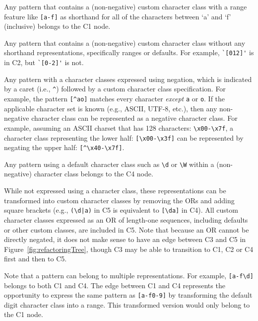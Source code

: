 \begin{description}  \itemsep -1pt
\item[C1:] Any pattern that contains a (non-negative) custom character class with  a range feature like \verb![a-f]! as shorthand for all of the characters between `a' and `f' (inclusive) belongs to the C1 node.

\item[C2:] Any pattern that contains a (non-negative) custom character class  without any shorthand representations, specifically ranges or defaults. For example, \verb!`[012]'! is in C2, but \verb!`[0-2]'! is not.

\item[C3:] Any pattern with a character classes expressed using negation, which is indicated by a caret (i.e., \verb!^!) followed by a custom character class specification.
For example, the pattern \verb![^ao]! matches every character \emph{except} \verb!a! or \verb!o!.  If the applicable character set is known (e.g., ASCII, UTF-8, etc.), then any non-negative character class can be represented as a negative character class.  For example, assuming an ASCII charset that has 128 characters: \verb!\x00-\x7f!, a character class representing the lower half: \verb![\x00-\x3f]! can be represented by negating the upper half: \verb![^\x40-\x7f]!.


\item[C4:] Any pattern using a default character class such as \verb!\d! or \verb!\W! within a (non-negative) character class belongs to the C4 node.  

\item[C5:] While not expressed using a character class, these representations can be transformed into custom character classes by removing the ORs and adding square brackets (e.g., \verb!(\d|a)! in C5 is equivalent to \verb![\da]! in C4). All custom character classes expressed as an OR of length-one sequences, including defaults or other custom classes, are included in C5. Note that because an OR cannot be directly negated, it does not make sense to have an edge between C3 and C5 in Figure~\ref{fig:refactoringTree}, though C3 may be able to transition to C1, C2 or C4 first and then to C5. 
\end{description}

Note that a pattern can belong to multiple representations. For example,  \verb![a-f\d]! belongs to both C1 and C4.  The edge between C1 and C4 represents the opportunity to express the same pattern as \verb![a-f0-9]! by transforming the default digit character class into a range.  This transformed version would only belong to the C1 node.

